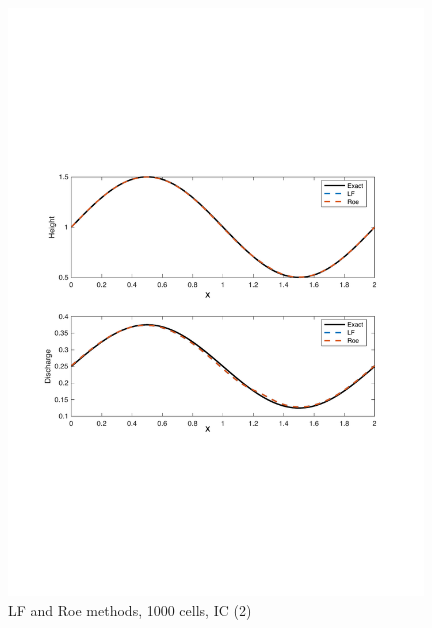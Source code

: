 \documentclass[11pt,a4paper]{article}
\begin{document}
\begin{figure}[!htb]
    \centering
    \includegraphics[width=11cm]{pictures/IC_1_1000_cells.pdf}
    \caption{LF and Roe methods, 1000 cells, IC (2)}
    \label{fig:IC_1_1000_cells}
\end{figure}
\end{document}
